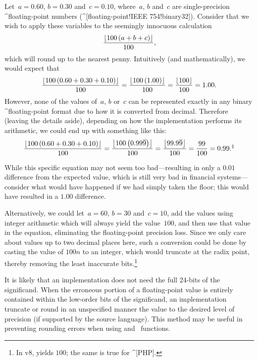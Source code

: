 \begin{ex}
  Let~$a=0.60$, $b=0.30$ and~$c=0.10$, where~$a$, $b$ and~$c$ are
  single-precision ^floating-point numbers (^[floating-point!IEEE
  754!binary32]).  Consider that we wish to apply these variables to the
  seemingly innocuous calculation
    $${\left\lfloor 100\left(a+b+c\right) \right\rfloor \over100},$$
  which will round up to the nearest penny. Intuitively (and mathematically), we
  would expect that
    $$
        {\left\lfloor 100\left(0.60+0.30+0.10\right) \right\rfloor \over100}
      = {\left\lfloor 100\left(1.00\right) \right\rfloor \over100}
      = {\left\lfloor 100 \right\rfloor \over100}
      = 1.00.
    $$
  However, none of the values of~$a$, $b$ or~$c$ can be represented exactly in
  any binary ^floating-point format due to how it is converted from decimal.
  Therefore (leaving the details aside), depending on how the implementation
  performs its arithmetic, we could end up with something like this:
    $$
        {\left\lfloor 100\left(0.60+0.30+0.10\right) \right\rfloor \over100}
      = {\left\lfloor 100\left(0.99\overline{9}\right) \right\rfloor \over100}
      = {\left\lfloor 99.9\overline{9} \right\rfloor \over100}
      = {99 \over100}
      = 0.99.\footnotemark
    $$

   While this specific equation may not seem too bad---resulting in only a
   $0.01$ difference from the expected value, which is still very bad in
   financial systems---consider what would have happened if we had simply taken
   the floor; this would have resulted in a $1.00$ difference.

   Alternatively, we could let~$a=60$, $b=30$ and~$c=10$, add the values using
   integer arithmetic which will always yield the value~$100$, and then use that
   value in the equation, eliminating the floating-point precision loss. Since
   we only care about values up to two decimal places here, such a conversion
   could be done by casting the value of $100n$ to an integer, which would
   truncate at the radix point, thereby removing the least inaccurate
   bits.\footnote{In v8,  yields $100$; the
   same is true for ^[PHP].}
\end{ex}

It is likely that an implementation does not need the full 24-bits of the
significand. When the erroneous portion of a floating-point value is entirely
contained within the low-order bits of the significand, an implementation \may
truncate or round in an unspecified manner the value to the desired level of
precision (if supported by the source language). This method may be useful in
preventing rounding errors when using  and~ functions.

